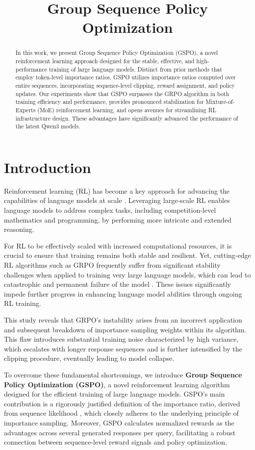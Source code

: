 \title{Group Sequence Policy Optimization}

\begin{abstract}
In this work, we present Group Sequence Policy Optimization (GSPO), a novel reinforcement learning approach designed for the stable, effective, and high-performance training of large language models. Distinct from prior methods that employ token-level importance ratios, GSPO utilizes importance ratios computed over entire sequences, incorporating sequence-level clipping, reward assignment, and policy updates. Our experiments show that GSPO surpasses the GRPO algorithm in both training efficiency and performance, provides pronounced stabilization for Mixture-of-Experts (MoE) reinforcement learning, and opens avenues for streamlining RL infrastructure design. These advantages have significantly advanced the performance of the latest Qwen3 models.
\end{abstract}

\section{Introduction}
\label{sec:intro}

Reinforcement learning (RL) has become a key approach for advancing the capabilities of language models at scale \citep{o1,dpsk-r1,qwq32b,qwen3}. Leveraging large-scale RL enables language models to address complex tasks, including competition-level mathematics and programming, by performing more intricate and extended reasoning.

For RL to be effectively scaled with increased computational resources, it is crucial to ensure that training remains both stable and resilient. Yet, cutting-edge RL algorithms such as GRPO \citep{grpo} frequently suffer from significant stability challenges when applied to training very large language models, which can lead to catastrophic and permanent failure of the model \citep{qwen3, minimax-m1}. These issues significantly impede further progress in enhancing language model abilities through ongoing RL training.

This study reveals that GRPO's instability arises from an incorrect application and subsequent breakdown of importance sampling weights within its algorithm. This flaw introduces substantial training noise characterized by high variance, which escalates with longer response sequences and is further intensified by the clipping procedure, eventually leading to model collapse.

To overcome these fundamental shortcomings, we introduce \textbf{Group Sequence Policy Optimization (GSPO)}, a novel reinforcement learning algorithm designed for the efficient training of large language models. GSPO's main contribution is a rigorously justified definition of the importance ratio, derived from sequence likelihood \citep{click}, which closely adheres to the underlying principle of importance sampling. Moreover, GSPO calculates normalized rewards as the advantages across several generated responses per query, facilitating a robust connection between sequence-level reward signals and policy optimization.

